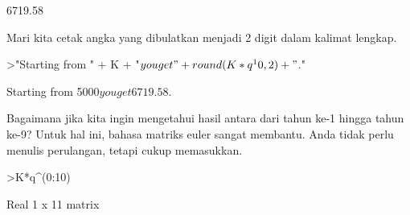 \documentclass[a4paper,10pt]{article}
\begin{document}
\begin{eulernotebook}
\begin{eulercomment}
\begin{eulercomment}
\begin{eulercomment}
\begin{eulercomment}
\begin{eulercomment}
\begin{eulercomment}
\begin{euleroutput}
      6719.58 
\end{euleroutput}
\begin{eulercomment}
Mari kita cetak angka yang dibulatkan menjadi 2 digit dalam kalimat
lengkap.
\end{eulercomment}
\begin{eulerprompt}
>"Starting from " + K + "$ you get " + round(K*q^10,2) + "$."
\end{eulerprompt}
\begin{euleroutput}
  Starting from 5000$ you get 6719.58$.
\end{euleroutput}
\begin{eulercomment}
Bagaimana jika kita ingin mengetahui hasil antara dari tahun ke-1
hingga tahun ke-9? Untuk hal ini, bahasa matriks euler sangat
membantu. Anda tidak perlu menulis perulangan, tetapi cukup
memasukkan.
\end{eulercomment}
\begin{eulerprompt}
>K*q^(0:10)
\end{eulerprompt}
\begin{euleroutput}
  Real 1 x 11 matrix
  

\end{euleroutput}
\end{eulercomment}
\end{eulercomment}
\end{eulercomment}
\end{eulercomment}
\end{eulercomment}
\end{eulercomment}
\end{eulernotebook}
\end{document}
